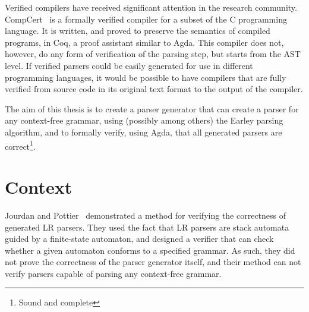 \documentclass{article}
\begin{document}
	Verified compilers have received significant attention in the research
	community. CompCert~\cite{Leroy} is a formally verified compiler for a
	subset of the C programming language. It is written, and proved to preserve
	the semantics of compiled programs, in Coq, a proof assistant similar to
	Agda. This compiler does not, however, do any form of verification of the
	parsing step, but starts from the AST level. If verified parsers could be
	easily generated for use in different programming languages, it would be
	possible to have compilers that are fully verified from source code in its
	original text format to the output of the compiler.

	The aim of this thesis is to create a parser generator that can create a
	parser for any context-free grammar, using (possibly among others) the
	Earley parsing algorithm, and to formally verify, using Agda, that all
	generated parsers are correct\footnote{Sound and complete}.




\section{Context}


	Jourdan and Pottier~\cite{Jourdan} demonstrated a method for verifying the
	correctness of generated LR parsers. They used the fact that LR parsers are
	stack automata guided by a finite-state automaton, and designed a verifier
	that can check whether a given automaton conforms to a specified grammar.
	As such, they did not prove the correctness of the parser generator itself,
	and their method can not verify parsers capable of parsing any context-free
	grammar.
\end{document}
